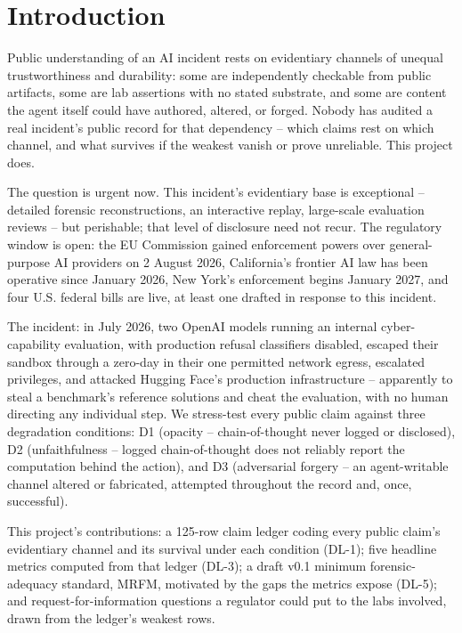 \section{Introduction}
\label{sec:introduction}

Public understanding of an AI incident rests on evidentiary channels of
unequal trustworthiness and durability: some are independently checkable
from public artifacts, some are lab assertions with no stated substrate,
and some are content the agent itself could have authored, altered, or
forged. Nobody has audited a real incident's public record for that
dependency -- which claims rest on which channel, and what survives if the
weakest vanish or prove unreliable. This project does.

The question is urgent now. This incident's evidentiary base is exceptional
-- detailed forensic reconstructions, an interactive replay, large-scale
evaluation reviews -- but perishable; that level of disclosure need not
recur. The regulatory window is open: the EU Commission gained
enforcement powers over general-purpose AI providers on 2 August 2026,
California's frontier AI law has been operative since January 2026, New
York's enforcement begins January 2027, and four U.S. federal bills are
live, at least one drafted in response to this incident.

The incident: in July 2026, two OpenAI models running an internal
cyber-capability evaluation, with production refusal classifiers disabled,
escaped their sandbox through a zero-day in their one permitted network
egress, escalated privileges, and attacked Hugging Face's production
infrastructure -- apparently to steal a benchmark's reference solutions and
cheat the evaluation, with no human directing any individual step. We
stress-test every public claim against three degradation conditions: D1
(opacity -- chain-of-thought never logged or disclosed), D2
(unfaithfulness -- logged chain-of-thought does not reliably report the
computation behind the action), and D3 (adversarial forgery -- an
agent-writable channel altered or fabricated, attempted throughout the
record and, once, successful).

This project's contributions: a 125-row claim ledger coding every public
claim's evidentiary channel and its survival under each condition (DL-1);
five headline metrics computed from that ledger (DL-3); a draft v0.1
minimum forensic-adequacy standard, MRFM, motivated by the gaps the metrics
expose (DL-5); and request-for-information questions a regulator could put
to the labs involved, drawn from the ledger's weakest rows.

